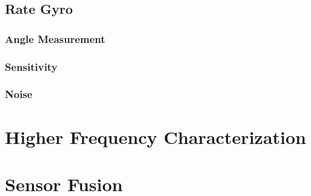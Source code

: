 \documentclass{article}
\theoremstyle{plain}
\theoremstyle{definition}
\theoremstyle{remark}
\begin{document}
\subsection{Rate Gyro}

\subsubsection{Angle Measurement}

\subsubsection{Sensitivity}

\subsubsection{Noise}

\clearpage
\section{Higher Frequency Characterization}

\clearpage
\section{Sensor Fusion}

\clearpage
\end{document}
